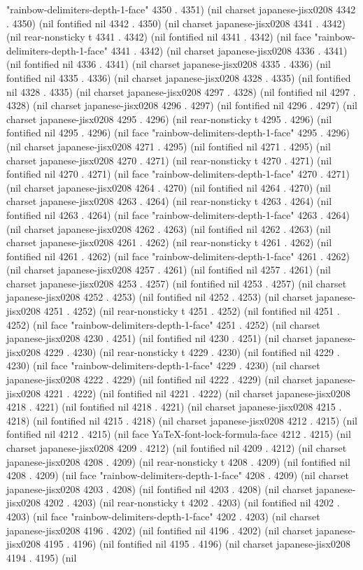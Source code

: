 "rainbow-delimiters-depth-1-face" 4350 . 4351) (nil charset japanese-jisx0208 4342 . 4350) (nil fontified nil 4342 . 4350) (nil charset japanese-jisx0208 4341 . 4342) (nil rear-nonsticky t 4341 . 4342) (nil fontified nil 4341 . 4342) (nil face "rainbow-delimiters-depth-1-face" 4341 . 4342) (nil charset japanese-jisx0208 4336 . 4341) (nil fontified nil 4336 . 4341) (nil charset japanese-jisx0208 4335 . 4336) (nil fontified nil 4335 . 4336) (nil charset japanese-jisx0208 4328 . 4335) (nil fontified nil 4328 . 4335) (nil charset japanese-jisx0208 4297 . 4328) (nil fontified nil 4297 . 4328) (nil charset japanese-jisx0208 4296 . 4297) (nil fontified nil 4296 . 4297) (nil charset japanese-jisx0208 4295 . 4296) (nil rear-nonsticky t 4295 . 4296) (nil fontified nil 4295 . 4296) (nil face "rainbow-delimiters-depth-1-face" 4295 . 4296) (nil charset japanese-jisx0208 4271 . 4295) (nil fontified nil 4271 . 4295) (nil charset japanese-jisx0208 4270 . 4271) (nil rear-nonsticky t 4270 . 4271) (nil fontified nil 4270 . 4271) (nil face "rainbow-delimiters-depth-1-face" 4270 . 4271) (nil charset japanese-jisx0208 4264 . 4270) (nil fontified nil 4264 . 4270) (nil charset japanese-jisx0208 4263 . 4264) (nil rear-nonsticky t 4263 . 4264) (nil fontified nil 4263 . 4264) (nil face "rainbow-delimiters-depth-1-face" 4263 . 4264) (nil charset japanese-jisx0208 4262 . 4263) (nil fontified nil 4262 . 4263) (nil charset japanese-jisx0208 4261 . 4262) (nil rear-nonsticky t 4261 . 4262) (nil fontified nil 4261 . 4262) (nil face "rainbow-delimiters-depth-1-face" 4261 . 4262) (nil charset japanese-jisx0208 4257 . 4261) (nil fontified nil 4257 . 4261) (nil charset japanese-jisx0208 4253 . 4257) (nil fontified nil 4253 . 4257) (nil charset japanese-jisx0208 4252 . 4253) (nil fontified nil 4252 . 4253) (nil charset japanese-jisx0208 4251 . 4252) (nil rear-nonsticky t 4251 . 4252) (nil fontified nil 4251 . 4252) (nil face "rainbow-delimiters-depth-1-face" 4251 . 4252) (nil charset japanese-jisx0208 4230 . 4251) (nil fontified nil 4230 . 4251) (nil charset japanese-jisx0208 4229 . 4230) (nil rear-nonsticky t 4229 . 4230) (nil fontified nil 4229 . 4230) (nil face "rainbow-delimiters-depth-1-face" 4229 . 4230) (nil charset japanese-jisx0208 4222 . 4229) (nil fontified nil 4222 . 4229) (nil charset japanese-jisx0208 4221 . 4222) (nil fontified nil 4221 . 4222) (nil charset japanese-jisx0208 4218 . 4221) (nil fontified nil 4218 . 4221) (nil charset japanese-jisx0208 4215 . 4218) (nil fontified nil 4215 . 4218) (nil charset japanese-jisx0208 4212 . 4215) (nil fontified nil 4212 . 4215) (nil face YaTeX-font-lock-formula-face 4212 . 4215) (nil charset japanese-jisx0208 4209 . 4212) (nil fontified nil 4209 . 4212) (nil charset japanese-jisx0208 4208 . 4209) (nil rear-nonsticky t 4208 . 4209) (nil fontified nil 4208 . 4209) (nil face "rainbow-delimiters-depth-1-face" 4208 . 4209) (nil charset japanese-jisx0208 4203 . 4208) (nil fontified nil 4203 . 4208) (nil charset japanese-jisx0208 4202 . 4203) (nil rear-nonsticky t 4202 . 4203) (nil fontified nil 4202 . 4203) (nil face "rainbow-delimiters-depth-1-face" 4202 . 4203) (nil charset japanese-jisx0208 4196 . 4202) (nil fontified nil 4196 . 4202) (nil charset japanese-jisx0208 4195 . 4196) (nil fontified nil 4195 . 4196) (nil charset japanese-jisx0208 4194 . 4195) (nil 